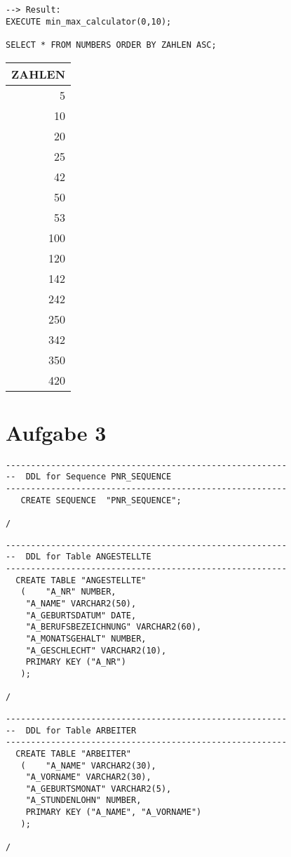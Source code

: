\documentclass{scrartcl}
\begin{document}
\begin{lstlisting}
--> Result: 
EXECUTE min_max_calculator(0,10);

SELECT * FROM NUMBERS ORDER BY ZAHLEN ASC;
\end{lstlisting}
\begin{tabular}{|r|}
\hline
 ZAHLEN \\
\hline
    5   \\
   10   \\
   20   \\
   25   \\
   42   \\
   50   \\
   53   \\
  100   \\
  120   \\
  142   \\
  242   \\
  250   \\
  342   \\
  350   \\
  420   \\
\hline
\end{tabular}

\newpage

\section*{Aufgabe 3}
\begin{lstlisting}
--------------------------------------------------------
--  DDL for Sequence PNR_SEQUENCE
--------------------------------------------------------
   CREATE SEQUENCE  "PNR_SEQUENCE";

/
\end{lstlisting}

\begin{lstlisting}
--------------------------------------------------------
--  DDL for Table ANGESTELLTE
--------------------------------------------------------
  CREATE TABLE "ANGESTELLTE" 
   (	"A_NR" NUMBER, 
	"A_NAME" VARCHAR2(50), 
	"A_GEBURTSDATUM" DATE, 
	"A_BERUFSBEZEICHNUNG" VARCHAR2(60), 
	"A_MONATSGEHALT" NUMBER, 
	"A_GESCHLECHT" VARCHAR2(10),
	PRIMARY KEY ("A_NR")
   );

/
\end{lstlisting}

\begin{lstlisting}
--------------------------------------------------------
--  DDL for Table ARBEITER
--------------------------------------------------------
  CREATE TABLE "ARBEITER" 
   (	"A_NAME" VARCHAR2(30), 
	"A_VORNAME" VARCHAR2(30), 
	"A_GEBURTSMONAT" VARCHAR2(5), 
	"A_STUNDENLOHN" NUMBER,
	PRIMARY KEY ("A_NAME", "A_VORNAME")
   );

/
\end{lstlisting}
\end{document}
